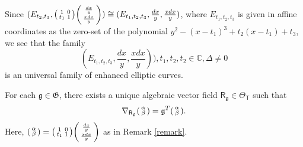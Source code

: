 \documentclass[10pt,a4paper]{amsart}
\begin{document}
\begin{remark} Since $(E_{t_2,t_3},\begin{psmallmatrix}1 & 0\\  t_1 & 1\end{psmallmatrix}\begin{psmallmatrix}\frac{dx}{y} \\ \frac{xdx}{y}\end{psmallmatrix})\cong (E_{t_1,t_2,t_3},\frac{dx}{y},\frac{xdx}{y})$, where  $E_{t_1,t_2,t_3}$ is given in affine coordinates as the zero-set of the polynomial $y^2-(x-t_1)^3+t_2(x-t_1)+t_3$, we see that the family \begin{equation}(E_{t_1,t_2,t_3},\frac{dx}{y},\frac{xdx}{y})), t_1,t_2,t_2\in\mathbb{C}, \Delta\neq 0\end{equation}is an universal family of enhanced elliptic curves. 
\end{remark}\label{remark}

\begin{theorem}\label{bigteo}
For each $\mathfrak{g}\in \mathfrak{G}$, there exists a unique algebraic vector field $\mathsf{R}_{\mathfrak{g}}\in \Theta_{\mathsf{T}}$ such that
\begin{equation}\label{equation}
\nabla_{\mathsf{R}_{\mathfrak{g}}} \begin{psmallmatrix}\alpha\\
\beta\end{psmallmatrix}=\mathfrak{g}^T\begin{psmallmatrix}\alpha\\
\beta\end{psmallmatrix}.
\end{equation}
Here, $\begin{psmallmatrix}\alpha\\
\beta\end{psmallmatrix}=\begin{psmallmatrix}1 & 0\\  t_1 & 1\end{psmallmatrix}\begin{psmallmatrix}\frac{dx}{y} \\ \frac{xdx}{y}\end{psmallmatrix}$ as in Remark \ref{remark}.

\end{theorem}
\end{document}
